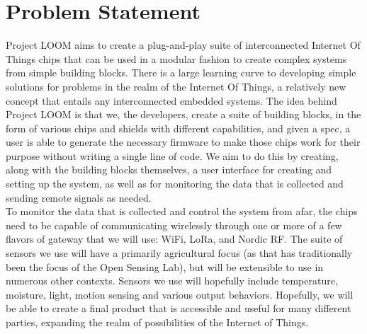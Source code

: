 \documentclass[onecolumn, draftclsnofoot,10pt, compsoc]{IEEEtran}
\begin{document}
\section{Problem Statement}
Project LOOM aims to create a plug-and-play suite of interconnected Internet Of Things chips that can be used in a modular fashion to create complex systems from simple building blocks.
There is a large learning curve to developing simple solutions for problems in the realm of the Internet Of Things, a relatively new concept that entails any interconnected embedded systems.
The idea behind Project LOOM is that we, the developers, create a suite of building blocks, in the form of various chips and shields with different capabilities, and given a spec, a user is able to generate the necessary firmware to make those chips work for their purpose without writing a single line of code.
We aim to do this by creating, along with the building blocks themselves, a user interface for creating and setting up the system, as well as for monitoring the data that is collected and sending remote signals as needed. \\
To monitor the data that is collected and control the system from afar, the chips need to be capable of communicating wirelessly through one or more of a few flavors of gateway that we will use: WiFi, LoRa, and Nordic RF.
The suite of sensors we use will have a primarily agricultural focus (as that has traditionally been the focus of the Open Sensing Lab), but will be extensible to use in numerous other contexts.
Sensors we use will hopefully include temperature, moisture, light, motion sensing and various output behaviors.
Hopefully, we will be able to create a final product that is accessible and useful for many different parties, expanding the realm of possibilities of the Internet of Things.
\end{document}
